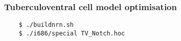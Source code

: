  \newpage
%



\subsubsection[TV cell model]{Tuberculoventral cell model optimisation}

\begin{verbatim}
    $ ./buildnrn.sh
    $ ./i686/special TV_Notch.hoc
\end{verbatim}


